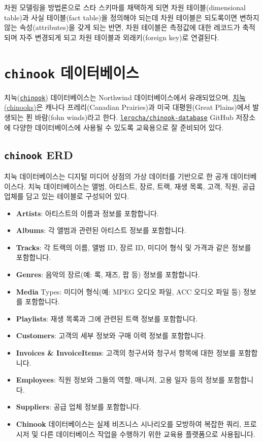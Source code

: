 \documentclass[
  letterpaper,
  chapter,a4paper,showtrims,openright,hidelinks]{oblivoir}
\providecommand{\tightlist}{%
  \setlength{\itemsep}{0pt}\setlength{\parskip}{0pt}}\usepackage{longtable,booktabs,array}
\begin{document}
차원 모델링을 방법론으로 스타 스키마를 채택하게 되면 차원
테이블(dimensional table)과 사실 테이블(fact table)을 정의해야 되는데
차원 테이블은 되도록이면 변하지 않는 속성(attributes)을 갖게 되는 반면,
차원 테이블은 측정값에 대한 레코드가 축적되며 자주 변경되게 되고 차원
테이블과 외래키(foreign key)로 연결된다.

\hypertarget{chinook-database}{%
\section{\texorpdfstring{\texttt{chinook}
데이터베이스}{chinook 데이터베이스}}\label{chinook-database}}

치눅(\href{https://archive.codeplex.com/?p=chinookdatabase}{\texttt{chinook}})
데이터베이스는 Northwind 데이터베이스에서 유래되었으며,
\href{https://en.wikipedia.org/wiki/Chinook_wind}{치눅(chinooks)}은
캐나다 프레리(Canadian Prairies)과 미국 대평원(Great Plains)에서
발생되는 푄 바람(fohn winds)라고 한다.
\href{https://github.com/lerocha/chinook-database}{\texttt{lerocha/chinook-database}}
GitHub 저장소에 다양한 데이터베이스에 사용될 수 있도록 교육용으로 잘
준비되어 있다.

\hypertarget{chinook-database-erd}{%
\subsection{\texorpdfstring{\texttt{chinook}
ERD}{chinook ERD}}\label{chinook-database-erd}}

치눅 데이터베이스는 디지털 미디어 상점의 가상 데이터를 기반으로 한 공개
데이터베이스다. 치눅 데이터베이스는 앨범, 아티스트, 장르, 트랙, 재생
목록, 고객, 직원, 공급 업체를 담고 있는 테이블로 구성되어 있다.

\begin{itemize}
\tightlist
\item
  \textbf{Artists}: 아티스트의 이름과 정보를 포함합니다.
\item
  \textbf{Albums}: 각 앨범과 관련된 아티스트 정보를 포함합니다.
\item
  \textbf{Tracks}: 각 트랙의 이름, 앨범 ID, 장르 ID, 미디어 형식 및
  가격과 같은 정보를 포함합니다.
\item
  \textbf{Genres}: 음악의 장르(예: 록, 재즈, 팝 등) 정보를 포함합니다.
\item
  \textbf{Media} Types: 미디어 형식(예: MPEG 오디오 파일, ACC 오디오
  파일 등) 정보를 포함합니다.
\item
  \textbf{Playlists}: 재생 목록과 그에 관련된 트랙 정보를 포함합니다.
\item
  \textbf{Customers}: 고객의 세부 정보와 구매 이력 정보를 포함합니다.
\item
  \textbf{Invoices \& InvoiceItems}: 고객의 청구서와 청구서 항목에 대한
  정보를 포함합니다.
\item
  \textbf{Employees}: 직원 정보와 그들의 역할, 매니저, 고용 일자 등의
  정보를 포함합니다.
\item
  \textbf{Suppliers}: 공급 업체 정보를 포함합니다.
\item
  \textbf{Chinook} 데이터베이스는 실제 비즈니스 시나리오를 모방하여
  복잡한 쿼리, 프로시저 및 다른 데이터베이스 작업을 수행하기 위한 교육용
  플랫폼으로 사용됩니다.
\end{itemize}
\end{document}
